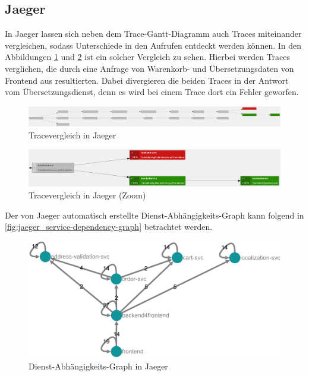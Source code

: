 \subsection{Jaeger}
\label{sec:demo-jaeger}

In Jaeger lassen sich neben dem Trace-Gantt-Diagramm auch Traces miteinander vergleichen, sodass Unterschiede in den Aufrufen entdeckt werden können. In den Abbildungen \ref*{fig:jaeger_comparison-all} und \ref*{fig:jaeger_comparison-zoom} ist ein solcher Vergleich zu sehen. Hierbei werden Traces verglichen, die durch eine Anfrage von Warenkorb- und Übersetzungsdaten von Frontend aus resultierten. Dabei divergieren die beiden Traces in der Antwort vom Übersetzungsdienst, denn es wird bei einem Trace dort ein Fehler geworfen.

\begin{figure}[H]
	\centering
	\includegraphics[width=1.00\linewidth]{img/99_postscript/jaeger_comparison-all.png}
	\caption{Tracevergleich in Jaeger}
	\label{fig:jaeger_comparison-all}
\end{figure}

\begin{figure}[H]
	\centering
	\includegraphics[width=1.00\linewidth]{img/99_postscript/jaeger_comparison-zoom.png}
	\caption{Tracevergleich in Jaeger (Zoom)}
	\label{fig:jaeger_comparison-zoom}
\end{figure}

Der von Jaeger automatisch erstellte Dienst-Abhängigkeits-Graph kann folgend in \autoref{fig:jaeger_service-dependency-graph} betrachtet werden.

\begin{figure}[H]
	\centering
	\includegraphics[width=1.00\linewidth]{img/99_postscript/jaeger_service-dependency-graph.png}
	\caption{Dienst-Abhängigkeits-Graph in Jaeger}
	\label{fig:jaeger_service-dependency-graph}
\end{figure}